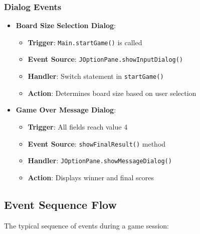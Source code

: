 \documentclass[12pt,a4paper]{article}
\begin{document}
\subsubsection{Dialog Events}
\begin{itemize}
    \item \textbf{Board Size Selection Dialog}:
    \begin{itemize}
        \item \textbf{Trigger}: \texttt{Main.startGame()} is called
        \item \textbf{Event Source}: \texttt{JOptionPane.showInputDialog()}
        \item \textbf{Handler}: Switch statement in \texttt{startGame()}
        \item \textbf{Action}: Determines board size based on user selection
    \end{itemize}
    
    \item \textbf{Game Over Message Dialog}:
    \begin{itemize}
        \item \textbf{Trigger}: All fields reach value 4
        \item \textbf{Event Source}: \texttt{showFinalResult()} method
        \item \textbf{Handler}: \texttt{JOptionPane.showMessageDialog()}
        \item \textbf{Action}: Displays winner and final scores
    \end{itemize}
\end{itemize}

\subsection{Event Sequence Flow}

The typical sequence of events during a game session:
\end{document}
